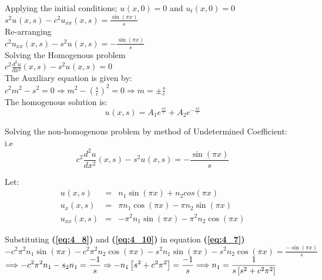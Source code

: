 \documentclass[12pt]{report}
\newcommand{\Un}[2]{u_{#1}(#2)}
\newcommand{\NI}{\noindent}
\newcommand{\psq}{\pi^{2}}
\newcommand{\bt}[1]{\textbf{#1}}
\newcommand{\refn}[1]{\bt{(\ref{#1})}}
\begin{document}
\NI Applying the initial conditions; $\Un{}{x,0} = 0$ and $\Un{t}{x,0} = 0 $ \\[0.2cm]
$\displaystyle
s^2\Un{}{x,s} - c^2 \Un{xx}{x,s} = \frac{\sin(\pi x)}{s}
$\\[0.2cm]

\NI Re-arranging \\[0.2cm]
$\displaystyle
c^2 \Un{xx}{x,s} - s^2 \Un{}{x,s} = - \frac{\sin(\pi x)}{s}
$\\[0.2cm]

\NI Solving the Homogenous problem \\[0.2cm]
$\displaystyle
c^{2} \frac{d^2 u}{dx^2}(x,s) - s^2 \Un{}{x,s} = 0
$\\[0.2cm]

\NI The Auxiliary equation is given by: \\[0.2cm]
$\displaystyle
c^2 m^2 - s^2 = 0 \Longrightarrow m^2 - \left(\frac{s}{c}\right)^2 = 0 \Longrightarrow m = \pm \frac{s}{c}
$\\[0.2cm]

\NI The homogenous solution is: 
\begin{equation}
	\Un{}{x,s} = A_1 e^{\frac{sx}{c}} + A_2 e^{-\frac{sx}{c}}
\end{equation}

\NI Solving the non-homogenous problem by method of Undetermined Coefficient: \\ i.e
\begin{equation}
	c^2 \frac{d^2 u}{d x^2}(x,s) - s^2 \Un{}{x,s} = - \frac{\sin(\pi x)}{s} \label{eq:4_7}
\end{equation}

\NI Let:
\begin{eqnarray}
	\Un{}{x,s} &=& n_1 \sin(\pi x) + n_2 cos(\pi x) \label{eq:4_8}\\
	\Un{x}{x,s} &=& \pi n_1 \cos(\pi x) - \pi n_2 \sin(\pi x)\label{eq:4_9} \\
	\Un{xx}{x,s} &=& -\psq n_1 \sin(\pi x) - \psq n_2 \cos(\pi x)\label{eq:4_10}
\end{eqnarray}

\NI Substituting \refn{eq:4_8} and \refn{eq:4_10} in equation \refn{eq:4_7}\\
${\displaystyle -c^{2}\psq n_{1}\sin(\pi x) - c^{2}\psq n_{2}\cos(\pi x) - s^{2}n_{1}\sin(\pi x) -  s^{2}n_{2}\cos(\pi x) = \frac{-\sin(\pi x)}{s}}$\\[0.2cm]
$ \Longrightarrow \displaystyle -c^{2}\psq n_{1} - s_{2}n_{1}  = \frac{-1}{s} \Rightarrow -n_{1}\left[s^{2} + c^{2}\psq \right] = \frac{-1}{s} \\ 
\Longrightarrow n_{1} = \frac{1}{s\left[s^{2} + c^{2}\psq \right]}
$\\[0.2cm]
\end{document}
